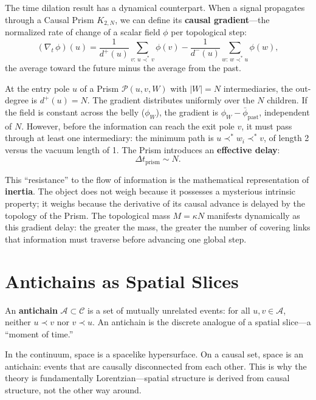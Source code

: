 \documentclass[11pt, a4paper, openany]{book}
\newcommand{\covers}{\prec^*}              %
\newcommand{\KC}[1]{\textnormal{(\textsc{kc}~#1)}}
\begin{document}
The time dilation result has a dynamical counterpart. When a signal
propagates through a Causal Prism $K_{2,N}$, we can define its
\textbf{causal gradient}---the normalized rate of change of a scalar
field $\phi$ per topological step:
\begin{equation}\label{eq:causal-gradient-vol1}
  (\nabla_t\,\phi)(u) =
  \frac{1}{d^+(u)}\sum_{v:\,u\covers v}\phi(v)
  - \frac{1}{d^-(u)}\sum_{w:\,w\covers u}\phi(w),
\end{equation}
the average toward the future minus the average from the past.

At the entry pole $u$ of a Prism $\mathcal{P}(u,v,W)$ with $|W| = N$
intermediaries, the out-degree is $d^+(u) = N$. The gradient distributes
uniformly over the $N$ children. If the field is constant across the
belly ($\phi_W$), the gradient is $\phi_W - \bar{\phi}_{\mathrm{past}}$,
independent of $N$. However, before the information can reach the exit
pole $v$, it must pass through at least one intermediary: the minimum
path is $u \covers w_i \covers v$, of length 2 versus the vacuum
length of 1. The Prism introduces an \textbf{effective delay}:
\[
  \Delta t_{\mathrm{prism}} \sim N.
\]

This ``resistance'' to the flow of information is the mathematical
representation of \textbf{inertia}. The object does not weigh because
it possesses a mysterious intrinsic property; it weighs because the
derivative of its causal advance is delayed by the topology of the
Prism. The topological mass $M = \kappa N$ manifests dynamically as
this gradient delay: the greater the mass, the greater the number of
covering links that information must traverse before advancing one
global step.

\section{Antichains as Spatial Slices}

\begin{definition}[Antichain \KC{Def.~3.3}]\label{def:antichain}
An \textbf{antichain} $\mathcal{A} \subset \mathcal{C}$ is a set of
mutually unrelated events: for all $u, v \in \mathcal{A}$, neither
$u \prec v$ nor $v \prec u$. An antichain is the discrete analogue of a
spatial slice---a ``moment of time.''
\end{definition}

\noindent
In the continuum, space is a spacelike hypersurface. On a causal set,
space is an antichain: events that are causally disconnected from each
other. This is why the theory is fundamentally Lorentzian---spatial
structure is derived from causal structure, not the other way around.
\end{document}
